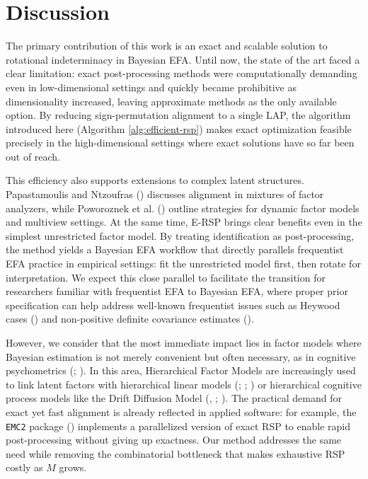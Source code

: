 \documentclass[
  man,
  longtable,
  nolmodern,
  notxfonts,
  notimes,
  colorlinks=true,linkcolor=blue,citecolor=blue,urlcolor=blue]{apa7}
\theoremstyle{plain}
\theoremstyle{plain}
\theoremstyle{remark}
\begin{document}
\section{Discussion}\label{discussion}

The primary contribution of this work is an exact and scalable solution
to rotational indeterminacy in Bayesian EFA. Until now, the state of the
art faced a clear limitation: exact post-processing methods were
computationally demanding even in low-dimensional settings and quickly
became prohibitive as dimensionality increased, leaving approximate
methods as the only available option. By reducing sign-permutation
alignment to a single LAP, the algorithm introduced here (Algorithm
\ref{alg:efficient-rsp}) makes exact optimization feasible precisely in
the high-dimensional settings where exact solutions have so far been out
of reach.

This efficiency also supports extensions to complex latent structures.
Papastamoulis and Ntzoufras
() discusses
alignment in mixtures of factor analyzers, while Poworoznek et al.
() outline strategies for dynamic
factor models and multiview settings. At the same time, E-RSP brings
clear benefits even in the simplest unrestricted factor model. By
treating identification as post-processing, the method yields a Bayesian
EFA workflow that directly parallels frequentist EFA practice in
empirical settings: fit the unrestricted model first, then rotate for
interpretation. We expect this close parallel to facilitate the
transition for researchers familiar with frequentist EFA to Bayesian
EFA, where proper prior specification can help address well-known
frequentist issues such as Heywood cases
() and non-positive
definite covariance estimates
().

However, we consider that the most immediate impact lies in factor
models where Bayesian estimation is not merely convenient but often
necessary, as in cognitive psychometrics
(;
). In this area,
Hierarchical Factor Models are increasingly used to link latent factors
with hierarchical linear models (; ;
) or hierarchical
cognitive process models like the Drift Diffusion Model
(,
;
). The practical
demand for exact yet fast alignment is already reflected in applied
software: for example, the \texttt{EMC2} package
() implements a parallelized
version of exact RSP to enable rapid post-processing without giving up
exactness. Our method addresses the same need while removing the
combinatorial bottleneck that makes exhaustive RSP costly as \(M\)
grows.
\end{document}
